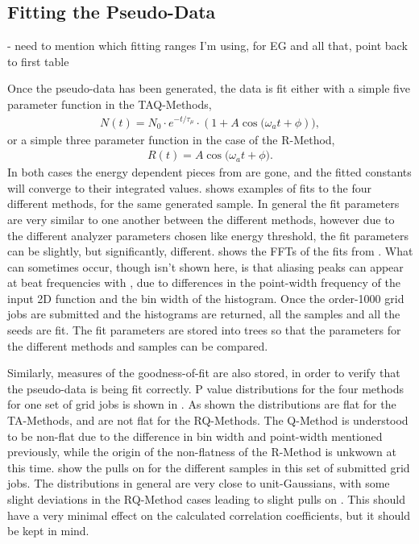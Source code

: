 \subsection{Fitting the Pseudo-Data}

- need to mention which fitting ranges I'm using, for EG and all that, point back to first table


Once the pseudo-data has been generated, the data is fit either with a simple five parameter function in the TAQ-Methods,
\begin{align}
    N(t) = N_{0} \cdot e^{-t/\tau_{\mu}} \cdot (1 + A \cos{(\omega_{a}t + \phi})),
\label{eq:fiveParFit}
\end{align}
or a simple three parameter function in the case of the R-Method,
\begin{align}
    R(t) =A \cos{(\omega_{a}t + \phi}).
\label{eq:ratioFit}
\end{align}
In both cases the energy dependent pieces from  are gone, and the fitted constants will converge to their integrated values.  shows examples of fits to the four different methods, for the same generated sample. In general the fit parameters are very similar to one another between the different methods, however due to the different analyzer parameters chosen like energy threshold, the fit parameters can be slightly, but significantly, different.  shows the FFTs of the fits from . What can sometimes occur, though isn't shown here, is that aliasing peaks can appear at beat frequencies with \wa, due to differences in the point-width frequency of the input 2D function and the bin width of the histogram. Once the order-1000 grid jobs are submitted and the histograms are returned, all the samples and all the seeds are fit. The fit parameters are stored into \ROOT trees so that the parameters for the different methods and samples can be compared. 

Similarly, measures of the goodness-of-fit are also stored, in order to verify that the pseudo-data is being fit correctly. P value distributions for the four methods for one set of grid jobs is shown in . As shown the distributions are flat for the TA-Methods, and are not flat for the RQ-Methods. The Q-Method is understood to be non-flat due to the difference in bin width and point-width mentioned previously, while the origin of the non-flatness of the R-Method is unkwown at this time.  show the pulls on \R for the different samples in this set of submitted grid jobs. The distributions in general are very close to unit-Gaussians, with some slight deviations in the RQ-Method cases leading to slight pulls on \R. This should have a very minimal effect on the calculated correlation coefficients, but it should be kept in mind.


